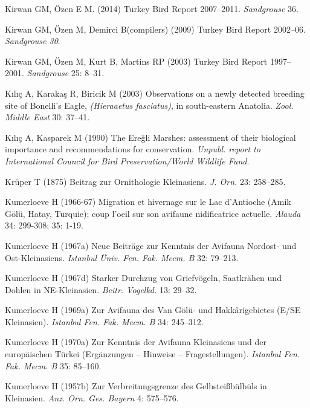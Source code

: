 \documentclass[
  letterpaper,
  DIV=11,
  numbers=noendperiod]{scrreprt}
\newlength{\cslhangindent}
\newenvironment{CSLReferences}[2] %
 {\begin{list}{}{%
  \setlength{\itemindent}{0pt}
  \setlength{\leftmargin}{0pt}
  \setlength{\parsep}{0pt}
  \ifodd #1
   \setlength{\leftmargin}{\cslhangindent}
   \setlength{\itemindent}{-1\cslhangindent}
  \fi
  \setlength{\itemsep}{#2\baselineskip}}}
 {\end{list}}
\begin{document}
\begin{CSLReferences}{0}{1}
Kirwan GM, Özen E M. (2014) {Turkey Bird Report 2007--2011}.
\emph{Sandgrouse} 36.

Kirwan GM, Özen M, Demirci B(compilers) (2009) {Turkey Bird Report
2002--06}. \emph{Sandgrouse 30}.

Kirwan GM, Özen M, Kurt B, Martins RP (2003) {Turkey Bird Report
1997--2001}. \emph{Sandgrouse} 25: 8--31.

Kılıç A, Karakaş R, Biricik M (2003) {Observations on a newly detected
breeding site of Bonelli's Eagle, \emph{(Hieraaetus fasciatus)}, in
south-eastern Anatolia}. \emph{Zool. Middle East} 30: 37--41.

Kılıç A, Kasparek M (1990) {The Ereğli Marshes: assessment of their
biological importance and recommendations for conservation}.
\emph{Unpubl. report to International Council for Bird
Preservation/World Wildlife Fund}.

Krüper T (1875) {Beitrag zur Ornithologie Kleinasiens}. \emph{J. Orn.}
23: 258--285.

Kumerloeve H (1966-67) {Migration et hivernage sur le Lac d'Antioche
(Amik Gölü, Hatay, Turquie); coup l'oeil sur son avifaune nidificatrice
actuelle}. \emph{Alauda} 34: 299-308; 35: 1-19.

Kumerloeve H (1967a) {Neue Beiträge zur Kenntnis der Avifauna Nordost-
und Ost-Kleinasiens}. \emph{Istanbul Üniv. Fen. Fak. Mecm. B} 32:
79--213.

Kumerloeve H (1967d) {Starker Durchzug von Griefvögeln, Saatkrähen und
Dohlen in NE-Kleinasien}. \emph{Beitr. Vogelkd.} 13: 29--32.

Kumerloeve H (1969a) {Zur Avifauna des Van Gölü- und Hakkârigebietes
(E/SE Kleinasien)}. \emph{Istanbul Fen. Fak. Mecm. B} 34: 245--312.

Kumerloeve H (1970a) {Zur Kenntnis der Avifauna Kleinasiens und der
europäischen Türkei (Ergänzungen -- Hinweise -- Fragestellungen)}.
\emph{Istanbul Fen. Fak. Mecm. B} 35: 85--160.

Kumerloeve H (1957b) {Zur Verbreitungsgrenze des Gelbsteißbülbüls in
Kleinasien}. \emph{Anz. Orn. Ges. Bayern} 4: 575--576.


\end{CSLReferences}
\end{document}
